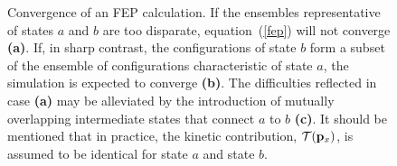 \begin{figure}[ht]
  \caption{Convergence of an FEP calculation. If the ensembles representative
           of states $a$ and $b$ are too disparate, equation~({\ref{fep}}) will
           not converge {\bfseries \sffamily (a)}.
           If, in sharp contrast, the configurations of
           state $b$ form a subset of the ensemble of configurations
           characteristic of state $a$, the simulation is expected
           to converge {\bfseries \sffamily (b)}.
           The difficulties reflected in case {\bfseries \sffamily (a)} may be
           alleviated by the introduction of mutually overlapping intermediate
           states that connect $a$ to $b$ {\bfseries \sffamily (c)}. It should be
           mentioned that in practice, the kinetic contribution, ${\cal T}({\bf p}_x)$,
           is assumed to be identical for state $a$ and state $b$.
           \label{fig:overlap}}
\end{figure}


